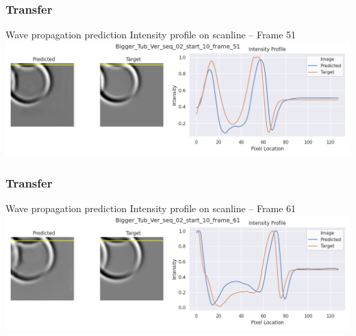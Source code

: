 \clearpage
\begin{frame}
    \frametitle{Transfer}

Wave propagation prediction \newline
Intensity profile on scanline -- Frame 51\\[\baselineskip]

\includegraphics[width=\textwidth, height=.55\textheight]{./Ressourcen/Praesentation/Bilder/WaveTransfer/DFP/Bigger_Tub_Ver_seq_02_start_10_frame_51.png}%

\end{frame}
\clearpage
\begin{frame}
    \frametitle{Transfer}

Wave propagation prediction \newline
Intensity profile on scanline -- Frame 61\\[\baselineskip]

\includegraphics[width=\textwidth, height=.55\textheight]{./Ressourcen/Praesentation/Bilder/WaveTransfer/DFP/Bigger_Tub_Ver_seq_02_start_10_frame_61.png}%

\end{frame}
\clearpage
